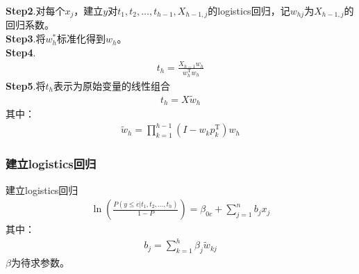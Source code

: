             \textbf{Step2}.对每个$x_j$，建立$y$对$t_1,t_2,\dots,t_{h-1},X_{h-1,j}$的logistics回归，记$w_{hj}$为$X_{h-1,j}$的回归系数。\\
            \textbf{Step3}.将$w_h^*$标准化得到$w_h$。\\
            \textbf{Step4}.
            \begin{align*}
            t_h = \frac{X_{h-1}w_h}{w_h^\mathrm{T}w_h}
            \end{align*}
            \textbf{Step5}.将$t_h$表示为原始变量的线性组合
            \begin{align*}
            t_h = X\tilde{w}_h
            \end{align*}
            其中：
            \begin{align*}
            \tilde{w}_h = \prod _{k=1}^{h-1}\left( I - w_kp_k^\mathrm{T} \right) w_h
            \end{align*}
        \subsubsection{建立logistics回归}
            \par
            建立logistics回归
            \begin{align*}
            \ln \left( \frac{P(y \leqslant c|t_1,t_2,\dots,t_h)}{1-P} \right) = \beta_{0c} + \sum_{j=1}^nb_jx_j
            \end{align*}
            其中：
            \begin{align*}
            b_j = \sum_{k=1}^h\beta_j\tilde{w}_{kj}
            \end{align*}
            $\beta$为待求参数。

